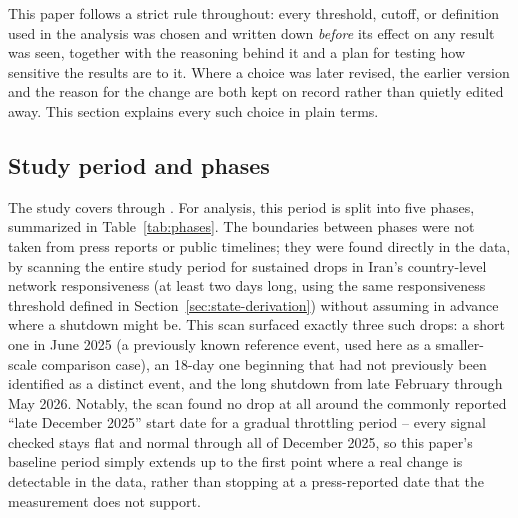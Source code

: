 This paper follows a strict rule throughout: every threshold, cutoff, or
definition used in the analysis was chosen and written down \emph{before}
its effect on any result was seen, together with the reasoning behind it
and a plan for testing how sensitive the results are to it. Where a choice
was later revised, the earlier version and the reason for the change are
both kept on record rather than quietly edited away. This section explains
every such choice in plain terms.

\subsection{Study period and phases}
\label{sec:phases}

The study covers \PZeroStart{} through \PFourBoundary{}. For analysis, this
period is split into five phases, summarized in Table~\ref{tab:phases}.
The boundaries between phases were not taken from press reports or public
timelines; they were found directly in the data, by scanning the entire
study period for sustained drops in Iran's country-level network
responsiveness (at least two days long, using the same responsiveness
threshold defined in Section~\ref{sec:state-derivation}) without assuming in
advance where a shutdown might be. This scan surfaced exactly three such
drops: a short one in June 2025 (a previously known reference event, used
here as a smaller-scale comparison case), an 18-day one beginning
\POneStart{} that had not previously been identified as a distinct event,
and the long shutdown from late February through May 2026. Notably, the
scan found no drop at all around the commonly reported ``late December 2025''
start date for a gradual throttling period -- every signal checked stays
flat and normal through all of December 2025, so this paper's baseline
period simply extends up to the first point where a real change is
detectable in the data, rather than stopping at a press-reported date that
the measurement does not support.

